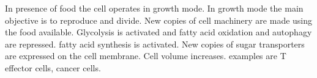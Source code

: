 In presence of food the cell operates in growth mode. In growth mode the main objective is to reproduce and divide. New copies of cell machinery are made using the food available. Glycolysis is activated and fatty acid oxidation and autophagy are repressed. fatty acid synthesis is activated. New copies of sugar transporters are expressed on the cell membrane. Cell volume increases. examples are T effector cells, cancer cells.
